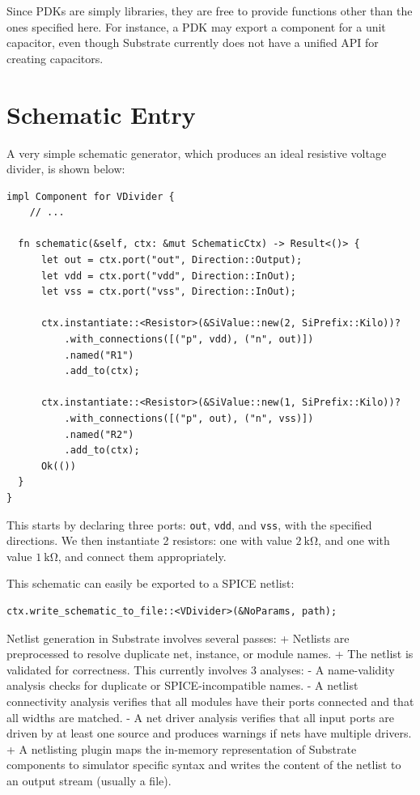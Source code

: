 Since PDKs are simply libraries, they are free to provide functions other than the ones specified here.
For instance, a PDK may export a component for a unit capacitor, even though Substrate currently does not
have a unified API for creating capacitors.

\section{Schematic Entry}

A very simple schematic generator, which produces an ideal resistive voltage divider, is shown below:

\begin{verbatim}
impl Component for VDivider {
    // ...
    
  fn schematic(&self, ctx: &mut SchematicCtx) -> Result<()> {
      let out = ctx.port("out", Direction::Output);
      let vdd = ctx.port("vdd", Direction::InOut);
      let vss = ctx.port("vss", Direction::InOut);

      ctx.instantiate::<Resistor>(&SiValue::new(2, SiPrefix::Kilo))?
          .with_connections([("p", vdd), ("n", out)])
          .named("R1")
          .add_to(ctx);

      ctx.instantiate::<Resistor>(&SiValue::new(1, SiPrefix::Kilo))?
          .with_connections([("p", out), ("n", vss)])
          .named("R2")
          .add_to(ctx);
      Ok(())
  }
}
\end{verbatim}

This starts by declaring three ports: \verb|out|, \verb|vdd|, and \verb|vss|, with the specified directions.
We then instantiate 2 resistors: one with value $\SI{2}{\kilo\ohm}$, and one with value $\SI{1}{\kilo\ohm}$,
and connect them appropriately.

This schematic can easily be exported to a SPICE netlist:

\begin{verbatim}
ctx.write_schematic_to_file::<VDivider>(&NoParams, path);
\end{verbatim}

Netlist generation in Substrate involves several passes:
+ Netlists are preprocessed to resolve duplicate net, instance, or module names.
+ The netlist is validated for correctness. This currently involves 3 analyses:
  - A name-validity analysis checks for duplicate or SPICE-incompatible names.
  - A netlist connectivity analysis verifies that all modules have their ports connected and that all widths are matched.
  - A net driver analysis verifies that all input ports are driven by at least one source and produces warnings if nets have multiple drivers.
+ A netlisting plugin maps the in-memory representation of Substrate components to simulator specific syntax and writes the content of the netlist to an output stream (usually a file).


